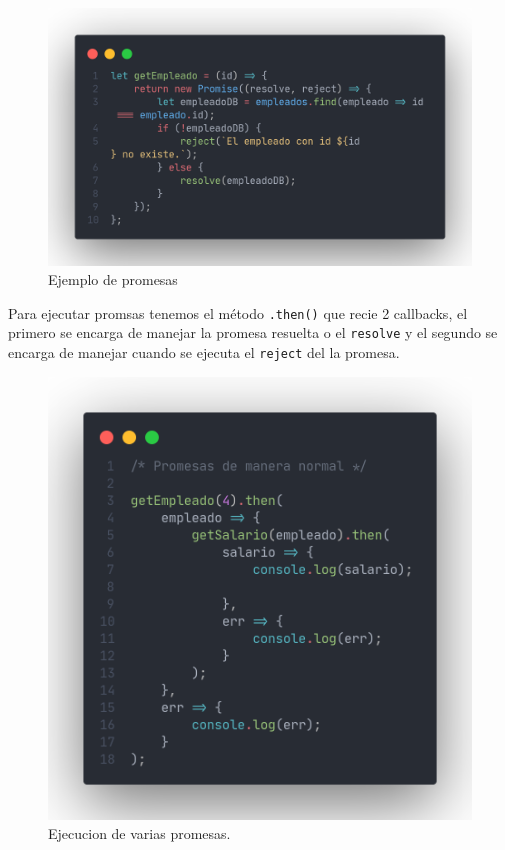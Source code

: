 \documentclass[12pt]{article}
\begin{document}
\begin{figure}[H]
	\centering
	\includegraphics[scale=.3]{assets/images/promesas-1.png}
	\caption{Ejemplo de promesas}
\end{figure}

Para ejecutar promsas tenemos el método \lstinline{.then()} que recie 2 callbacks, el primero se encarga de manejar la promesa resuelta o el \lstinline{resolve} y el segundo se encarga de manejar cuando se ejecuta el \lstinline{reject} del la promesa.

\begin{figure}[H]
	\centering
	\includegraphics[scale=0.2]{assets/images/promesas-2.png}
	\caption{Ejecucion de varias promesas.}
\end{figure}
\end{document}
